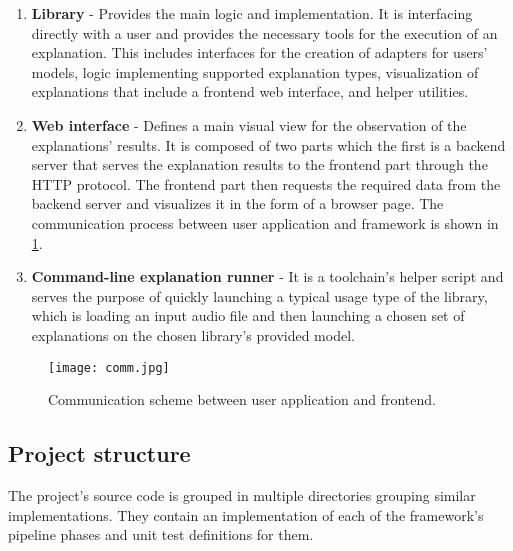 \documentclass[
    bindingoffset=5mm,  %
    footnoteindent=3mm, %
    hyphenation=true    %
]{src/wut-thesis}
\begin{document}
\begin{enumerate}
    \item \textbf{Library} - Provides the main logic and implementation. It is interfacing directly with a user and
    provides the necessary tools for the execution of an explanation. This includes interfaces for the creation of 
    adapters for users' models, logic implementing supported explanation types, visualization of explanations that 
    include a frontend web interface, and helper utilities.

    \item \textbf{Web interface} - Defines a main visual view for the observation of the explanations' results. It is
    composed of two parts which the first is a backend server that serves the explanation results to the frontend part
    through the HTTP protocol. The frontend part then requests the required data from the backend server and visualizes
    it in the form of a browser page. The communication process between user application and framework is shown in
    \ref{fig:CommunicationArchitecture}.

    \item \textbf{Command-line explanation runner} - It is a toolchain's helper script and serves the purpose of quickly 
    launching a typical usage type of the library, which is loading an input audio file and then launching a chosen set 
    of explanations on the chosen library's provided model.
\end{enumerate}

\begin{figure}[h!] %
    \centering
    \texttt{[image: comm.jpg]}
    \caption{Communication scheme between user application and frontend.}
    \label{fig:CommunicationArchitecture}
\end{figure}

\subsection{Project structure}

    The project’s source code is grouped in multiple directories grouping similar implementations. They contain an implementation of each of the framework’s pipeline phases
    and unit test definitions for them.
\end{document}

